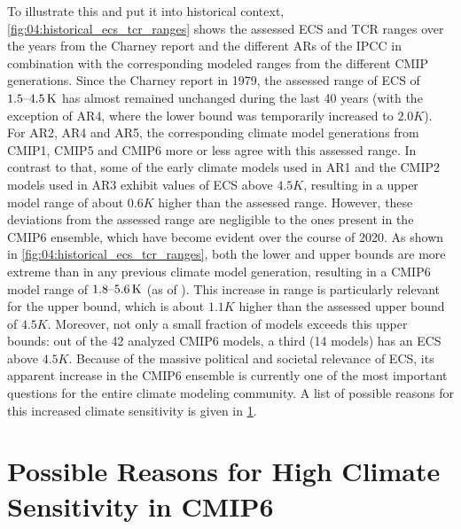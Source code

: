 To illustrate this and put it into historical context,
\cref{fig:04:historical_ecs_tcr_ranges} shows the assessed \ac{ECS} and
\ac{TCR} ranges over the years from the Charney report \autocite{Charney1979}
and the different \acp{AR} of the \ac{IPCC} in combination with the
corresponding modeled ranges from the different \ac{CMIP} generations. Since
the Charney report in 1979, the assessed range of \ac{ECS} of $\range{1.5}{4.5}
\unit{K}$ has almost remained unchanged during the last 40 years (with the
exception of \acs{AR}4, where the lower bound was temporarily increased to $2.0
\unit{K}$). For \acs{AR}2, \acs{AR}4 and \acs{AR}5, the corresponding climate
model generations from \acs{CMIP}1, \acs{CMIP}5 and \acs{CMIP}6 more or less
agree with this assessed range. In contrast to that, some of the early climate
models used in \acs{AR}1 and the \acs{CMIP}2 models used in \acs{AR}3 exhibit
values of \acs{ECS} above $4.5 \unit{K}$, resulting in a upper model range of
about $0.6 \unit{K}$ higher than the assessed range. However, these deviations
from the assessed range are negligible to the ones present in the \acs{CMIP}6
ensemble, which have become evident over the course of 2020. As shown in
\cref{fig:04:historical_ecs_tcr_ranges}, both the lower and upper bounds are
more extreme than in any previous climate model generation, resulting in a
\acs{CMIP}6 model range of $\range{1.8}{5.6} \unit{K}$ (as of \TheMonth{}).
This increase in range is particularly relevant for the upper bound, which is
about $1.1 \unit{K}$ higher than the assessed upper bound of $4.5 \unit{K}$.
Moreover, not only a small fraction of models exceeds this upper bounds: out of
the 42 analyzed \ac{CMIP}6 models, a third (14 models) has an \ac{ECS} above
$4.5 \unit{K}$. Because of the massive political and societal relevance of
\ac{ECS}, its apparent increase in the \ac{CMIP}6 ensemble is currently one of
the most important questions for the entire climate modeling community. A list
of possible reasons for this increased climate sensitivity is given in
\cref{sec:04:possible_reasons_high_ecs_cmip6}.


\section{Possible Reasons for High Climate Sensitivity in \acs{CMIP}6}
\label{sec:04:possible_reasons_high_ecs_cmip6}
